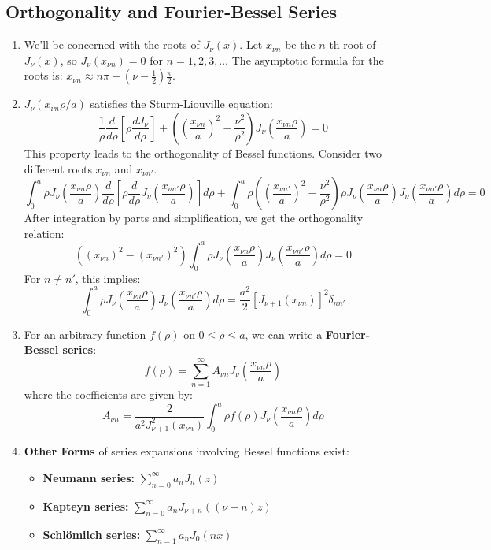 \documentclass{article}
\begin{document}
	\subsection*{Orthogonality and Fourier-Bessel Series}
	\begin{enumerate}
		\item We'll be concerned with the roots of $J_\nu(x)$. Let $x_{\nu n}$ be the $n$-th root of $J_\nu(x)$, so $J_\nu(x_{\nu n}) = 0$ for $n=1, 2, 3, \dots$
		The asymptotic formula for the roots is: $x_{\nu n} \approx n\pi + (\nu-\frac{1}{2})\frac{\pi}{2}$.
		
		\item $J_\nu(x_{\nu n} \rho/a)$ satisfies the Sturm-Liouville equation:
		$$ \frac{1}{\rho} \frac{d}{d\rho} \left[ \rho \frac{dJ_\nu}{d\rho} \right] + \left( \left(\frac{x_{\nu n}}{a}\right)^2 - \frac{\nu^2}{\rho^2} \right) J_\nu\left(\frac{x_{\nu n}\rho}{a}\right) = 0 $$
		This property leads to the orthogonality of Bessel functions. Consider two different roots $x_{\nu n}$ and $x_{\nu n'}$.
		$$ \int_0^a \rho J_\nu\left(\frac{x_{\nu n}\rho}{a}\right) \frac{d}{d\rho} \left[ \rho \frac{d}{d\rho} J_\nu\left(\frac{x_{\nu n'}\rho}{a}\right) \right] d\rho + \int_0^a \rho \left( \left(\frac{x_{\nu n'}}{a}\right)^2 - \frac{\nu^2}{\rho^2} \right) \rho J_\nu\left(\frac{x_{\nu n}\rho}{a}\right) J_\nu\left(\frac{x_{\nu n'}\rho}{a}\right) d\rho = 0 $$
		After integration by parts and simplification, we get the orthogonality relation:
		$$ \left( (x_{\nu n})^2 - (x_{\nu n'})^2 \right) \int_0^a \rho J_\nu\left(\frac{x_{\nu n}\rho}{a}\right) J_\nu\left(\frac{x_{\nu n'}\rho}{a}\right) d\rho = 0 $$
		For $n \neq n'$, this implies:
		$$ \int_0^a \rho J_\nu\left(\frac{x_{\nu n}\rho}{a}\right) J_\nu\left(\frac{x_{\nu n'}\rho}{a}\right) d\rho = \frac{a^2}{2} [J_{\nu+1}(x_{\nu n})]^2 \delta_{nn'} $$
		
		\item For an arbitrary function $f(\rho)$ on $0 \le \rho \le a$, we can write a \textbf{Fourier-Bessel series}:
		$$ f(\rho) = \sum_{n=1}^{\infty} A_{\nu n} J_\nu\left(\frac{x_{\nu n}\rho}{a}\right) $$
		where the coefficients are given by:
		$$ A_{\nu n} = \frac{2}{a^2 J_{\nu+1}^2(x_{\nu n})} \int_0^a \rho f(\rho) J_\nu\left(\frac{x_{\nu n}\rho}{a}\right) d\rho $$
		
		\item \textbf{Other Forms} of series expansions involving Bessel functions exist:
		\begin{itemize}
			\item \textbf{Neumann series:} $\sum_{n=0}^{\infty} a_n J_{n}(z)$
			\item \textbf{Kapteyn series:} $\sum_{n=0}^{\infty} a_n J_{\nu+n}((\nu+n)z)$
			\item \textbf{Schlömilch series:} $\sum_{n=1}^{\infty} a_n J_0(nx)$
		\end{itemize}
	\end{enumerate}
	
\end{document}
